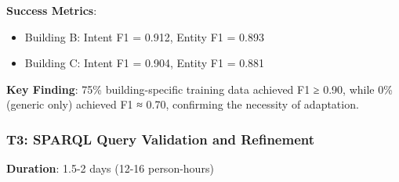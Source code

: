 \documentclass[acmlarge]{acmart}
\begin{document}
\textbf{Success Metrics}:
\begin{itemize}
    \item Building B: Intent F1 = 0.912, Entity F1 = 0.893
    \item Building C: Intent F1 = 0.904, Entity F1 = 0.881
\end{itemize}

\textbf{Key Finding}: 75\% building-specific training data achieved F1 ≥ 0.90, while 0\% (generic only) achieved F1 ≈ 0.70, confirming the necessity of adaptation.

\subsubsection{T3: SPARQL Query Validation and Refinement}

\textbf{Duration}: 1.5-2 days (12-16 person-hours)
\end{document}
